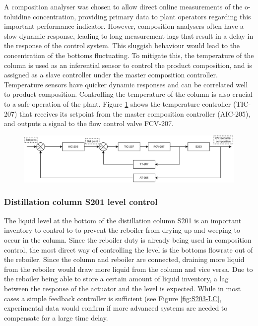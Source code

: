 A composition analyser was chosen to allow direct online measurements of the o-toluidine concentration, providing primary data to plant operators regarding this important performance indicator. However, composition analysers often have a slow dynamic response, leading to long measurement lags that result in a delay in the response of the control system. This sluggish behaviour would lead to the concentration of the bottoms fluctuating. To mitigate this, the temperature of the column is used as an inferential sensor to control the product composition, and is assigned as a slave controller under the master composition controller. Temperature sensors have quicker dynamic responses and can be correlated well to product composition. Controlling the temperature of the column is also crucial to a safe operation of the plant. Figure \ref{fig:S203-CC} shows the temperature controller (TIC-207) that receives its setpoint from the master composition controller (AIC-205), and outputs a signal to the flow control valve FCV-207.

\begin{figure}[H]
    \centering
    \includegraphics[width=\linewidth]{chapters/4-operation-control/4-Figures/S203-CC.pdf}
    \caption{}
    \label{fig:S203-CC}
\end{figure}


\subsubsection{Distillation column S201 level control}
The liquid level at the bottom of the distillation column S201 is an important inventory to control to to prevent the reboiler from drying up and weeping to occur in the column. Since the reboiler duty is already being used in composition control, the most direct way of controlling the level is the bottoms flowrate out of the reboiler. Since the column and reboiler are connected, draining more liquid from the reboiler would draw more liquid from the column and vice versa. Due to the reboiler being able to store a certain amount of liquid inventory, a lag between the response of the actuator and the level is expected. While in most cases a simple feedback controller is sufficient (see Figure \ref{fig:S203-LC}, experimental data would confirm if more advanced systems are needed to compensate for a large time delay. 

